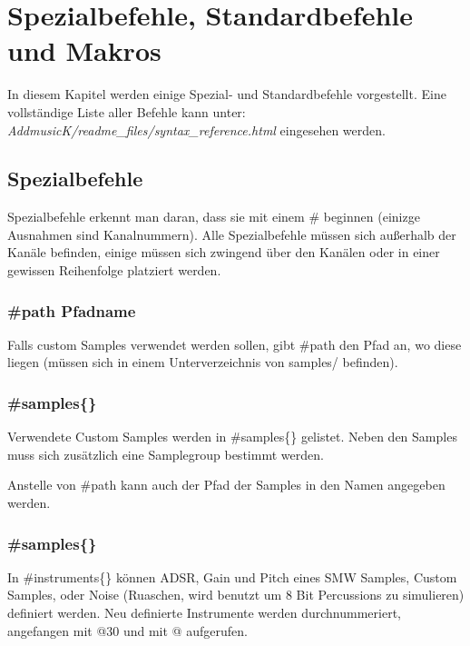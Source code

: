\section{Spezialbefehle, Standardbefehle und Makros}

In diesem Kapitel werden einige Spezial- und Standardbefehle vorgestellt.
Eine vollständige Liste aller Befehle kann unter: \\ \textit{AddmusicK/readme\_files/syntax\_reference.html} eingesehen werden.

\subsection{Spezialbefehle}

Spezialbefehle erkennt man daran, dass sie mit einem \# beginnen (einizge Ausnahmen sind Kanalnummern). Alle Spezialbefehle müssen sich außerhalb der Kanäle befinden, einige müssen sich zwingend über den Kanälen oder in einer gewissen Reihenfolge platziert werden.


\subsubsection*{\#path \dq Pfadname\dq{}}

Falls custom Samples verwendet werden sollen, gibt \#path den Pfad an, wo diese liegen (müssen sich in einem Unterverzeichnis von samples/ befinden).

\subsubsection*{\#samples\{\}}

Verwendete Custom Samples werden in \#samples\{\} gelistet. Neben den Samples muss sich zusätzlich eine Samplegroup bestimmt werden.

\medskip



\medskip

Anstelle von \#path kann auch der Pfad der Samples in den Namen angegeben werden.

\subsubsection*{\#samples\{\}}

In \#instruments\{\} können ADSR, Gain und Pitch eines SMW Samples, Custom Samples, oder Noise (Ruaschen, wird benutzt um 8 Bit Percussions zu simulieren) definiert werden. Neu definierte Instrumente werden durchnummeriert, angefangen mit @30 und mit @ aufgerufen.

